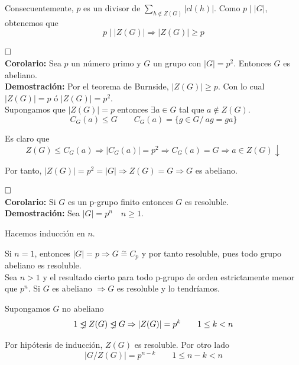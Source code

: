 \documentclass{article}
\newcommand{\unlhdneq}{%
  \mathrel{\ooalign{$\lneq$\cr\raise.22ex\hbox{$\lhd$}\cr}}}
\begin{document}
Consecuentemente, $p$ es un divisor de $\sum_{h\notin Z(G)}|cl(h)|$. Como $p\mid |G|$, obtenemos que
\begin{equation*}
p\mid |Z(G)|\Rightarrow |Z(G)|\geq p
\end{equation*}

$\hfill\square$ \\

\textbf{Corolario:} Sea $p$ un número primo y $G$ un grupo con $|G|=p^2$. Entonces $G$ es abeliano. \\

\textbf{Demostración:} Por el teorema de Burnside, $|Z(G)|\geq p$. Con lo cual $|Z(G)|=p$ ó $|Z(G)|=p^2$. \\

Supongamos que $|Z(G)|=p$ entonces $\exists a\in G$ tal que $a\notin Z(G)$.
\begin{equation*}
C_G(a)\leq G\qquad C_G(a)=\{g\in G/\:ag=ga\}
\end{equation*}

Es claro que 
\begin{equation*}
Z(G)\leq C_G(a)\Rightarrow |C_G(a)|=p^2\Rightarrow C_G(a)=G\Rightarrow a\in Z(G)\downarrow
\end{equation*}

Por tanto, $|Z(G)|=p^2=|G|\Rightarrow Z(G)=G\Rightarrow G$ es abeliano.

$\hfill\square$\\

\textbf{Corolario:} Si $G$ es un p-grupo finito entonces $G$ es resoluble. \\

\textbf{Demostración:} Sea $|G|=p^n\quad n\geq 1$.

Hacemos inducción en $n$.

Si $n=1$, entonces $|G|=p\Rightarrow G\overset{\sim}{=} C_p$ y por tanto resoluble, pues todo grupo abeliano es resoluble. \\

Sea $n>1$ y el resultado cierto para todo p-grupo de orden estrictamente menor que $p^n$. Si $G$ es abeliano $\Rightarrow G$ es resoluble y lo tendríamos.

Supongamos $G$ no abeliano
\begin{equation*}
1\unlhdneq Z(G)\unlhdneq G\Rightarrow |Z(G)|=p^k\qquad 1\leq k<n
\end{equation*}

Por hipótesis de inducción, $Z(G)$ es resoluble. Por otro lado
\begin{equation*}
|G/Z(G)|=p^{n-k}\qquad 1\leq n-k<n
\end{equation*}
\end{document}

